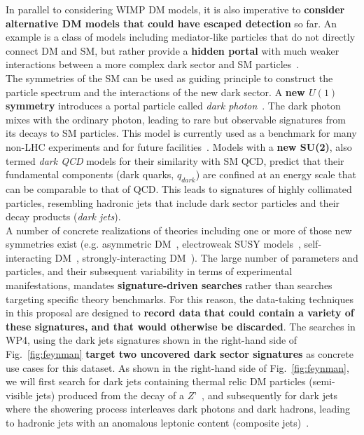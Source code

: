 In parallel to considering WIMP DM models, it is also imperative to \textbf{consider alternative DM models that could have escaped detection} so far. 
An example is a class of models including mediator-like particles that do not directly connect DM and SM, but rather provide a \textbf{hidden portal} with much weaker interactions between a more complex dark sector and SM particles~\cite{Strassler:2006im}. 
\\
\indent
The symmetries of the SM can be used as guiding principle to construct the particle spectrum and the interactions of the new dark sector. 
A \textbf{new $U(1)$ symmetry} introduces a portal particle called \textit{dark photon}~\cite{Holdom:1985ag,Curtin:2014cca}.   
The dark photon mixes with the ordinary photon, leading to rare but observable signatures from its decays to SM particles. 
This model is currently used as a benchmark for many non-LHC experiments and for future facilities~\cite{Strategy:2019vxc}. 
Models with a \textbf{new SU(2)}, also termed \textit{dark QCD} models for their similarity with SM QCD, predict that their fundamental components (dark quarks, $q_{dark}$) are confined at an energy scale that can be comparable to that of QCD. 
This leads to signatures of highly collimated particles, resembling hadronic jets that include dark sector particles and their decay products (\textit{dark jets}). 
\\
\indent
A number of concrete realizations of theories including one or more of those new symmetries exist (e.g. asymmetric DM~\cite{Zurek:2013wia}, electroweak SUSY models~\cite{Cheung:2009su}, self-interacting DM~\cite{Tulin:2017ara}, strongly-interacting DM~\cite{Bernreuther:2019pfb}). 
The large number of parameters and particles, and their subsequent variability in terms of experimental manifestations, mandates \textbf{signature-driven searches} rather than searches targeting specific theory benchmarks. 
For this reason, the data-taking techniques in this proposal are designed to \textbf{record data that could contain a variety of these signatures, and that would otherwise be discarded}. The searches in WP4, using the dark jets signatures shown in the right-hand side of Fig.~\ref{fig:feynman} \textbf{target two uncovered dark sector signatures} as concrete use cases for this dataset. As shown in the right-hand side of Fig.~\ref{fig:feynman}, we will first search for dark jets containing thermal relic DM particles (semi-visible jets) produced from the decay of a $Z’$~\cite{Bernreuther:2019pfb,Cohen:2017pzm}, and subsequently for dark jets where the showering process interleaves dark photons and dark hadrons, leading to hadronic jets with an anomalous leptonic content (composite jets)~\cite{Cheung:2009su,Park:2017rfb}.
%

